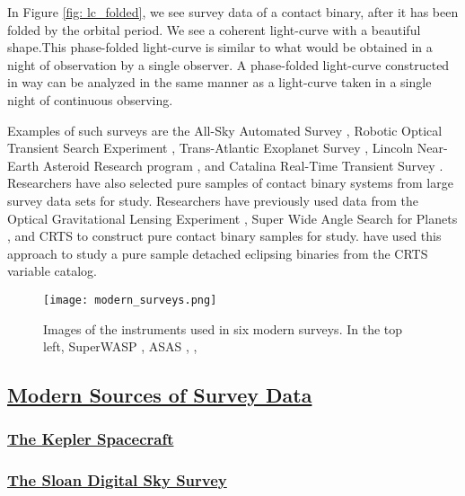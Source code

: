 \documentclass[12pt]{article} %
\numberwithin{equation}{section} %
\begin{document}
In Figure \ref{fig: lc_folded}, we see survey data of a contact binary, after it has been folded by the orbital period. We see a coherent light-curve with a beautiful shape.This phase-folded light-curve is similar to what would be obtained in a night of observation by a single observer. A phase-folded light-curve constructed in way can be analyzed in the same manner as a light-curve taken in a single night of continuous observing.

Examples of such surveys are the All-Sky Automated Survey \citep[ASAS,][]{pojmanski2000all}, Robotic Optical Transient Search Experiment \citep[ROTSE,][]{akerlof2000rotse}, Trans-Atlantic Exoplanet Survey \citep[TrES,][]{devor2008identification}, Lincoln Near-Earth Asteroid Research program \citep[LINEAR,][]{palaversa2013exploring}, and Catalina Real-Time Transient Survey \citep[CRTS,][]{drake2014catalina}. Researchers have also selected pure samples of contact binary systems from large survey data sets for study. Researchers have previously used data from the Optical Gravitational Lensing Experiment \citep[OGLE,][]{rucinski1996eclipsing}, Super Wide Angle Search for Planets \citep[SuperWASP,][]{norton2011short}, and CRTS \citep{drake2014ultra} to construct pure contact binary samples for study. \citet{lee2015properties} have used this approach to study a pure sample detached eclipsing binaries from the CRTS variable catalog. 

\begin{figure}[H]
\centering
\texttt{[image: modern\_surveys.png]}
\caption{Images of the instruments used in six modern surveys. In the top left, SuperWASP \citep[SuperWASP,][]{norton2011short}, ASAS \citep[ASAS,][]{pojmanski2000all}, \citep[ROTSE,][]{akerlof2000rotse},  }
\label{fig: modern_surveys}
\end{figure}


\subsection[Modern Sources of Survey Data]{\hyperlink{toc}{Modern Sources of Survey Data}}

\subsubsection[The Kepler Spacecraft]{\hyperlink{toc}{The Kepler Spacecraft}}

\subsubsection[The Sloan Digital Sky Survey]{\hyperlink{toc}{The Sloan Digital Sky Survey}}
\end{document}
